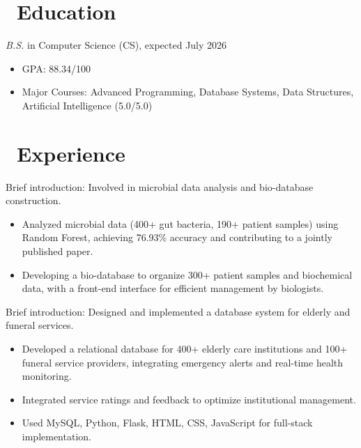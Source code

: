 \documentclass{resume}
\begin{document}



\section{\faGraduationCap\ Education}
\textit{B.S.} in Computer Science (CS), expected July 2026
\begin{itemize}
  \item GPA: 88.34/100
  \item Major Courses: Advanced Programming, Database Systems, Data Structures, Artificial Intelligence (5.0/5.0)
\end{itemize}

\section{\faUsers\ Experience}
Brief introduction: Involved in microbial data analysis and bio-database construction.
\begin{itemize}
  \item Analyzed microbial data (400+ gut bacteria, 190+ patient samples) using Random Forest, achieving 76.93\% accuracy and contributing to a jointly published paper.  
  \item Developing a bio-database to organize 300+ patient samples and biochemical data, with a front-end interface for efficient management by biologists.
\end{itemize}

Brief introduction: Designed and implemented a database system for elderly and funeral services.
\begin{itemize}
  \item Developed a relational database for 400+ elderly care institutions and 100+ funeral service providers, integrating emergency alerts and real-time health monitoring.  
  \item Integrated service ratings and feedback to optimize institutional management.
  \item Used MySQL, Python, Flask, HTML, CSS, JavaScript for full-stack implementation.
\end{itemize}
\end{document}
